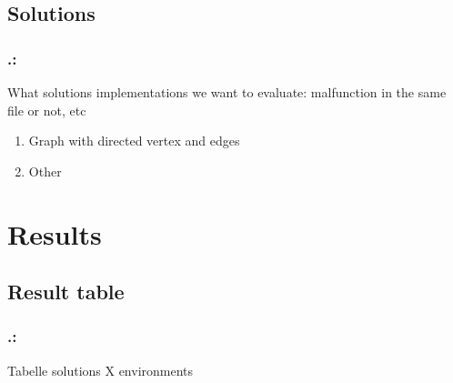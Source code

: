 \documentclass{beamer}
\begin{document}
\subsection{Solutions}

\begin{frame}
	\frametitle{\thesection.\thesubsection   \secname : \subsecname}
	What solutions implementations we want to evaluate:
	malfunction in the same file or not, etc 
	\begin{enumerate}
		\item{Graph with directed vertex and edges} 
		\item{Other} 
	\end{enumerate}
	
\end{frame}


\section{Results}

\subsection{Result table}
\begin{frame}
	\frametitle{\thesection.\thesubsection   \secname : \subsecname}
	Tabelle solutions X environments

\end{frame}
\end{document}
